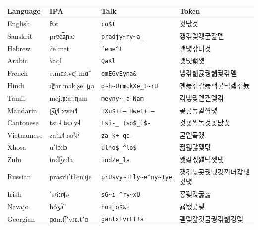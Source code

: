 \begin{center}
\small
\begin{tabular}{l >{\ipafont}l l >{\tokenfont}l}
\toprule
Language & IPA & Talk & Token \\
\midrule
English & θɔt & \texttt{co\$t} & 궟닧것 \\
Sanskrit & prɐd͡ʑɲaː & \texttt{pradjy\textasciitilde{}ny\textasciitilde{}a\_} & 걯긲뎇겏궅갎뎉 \\
Hebrew & ʔeˈmet & \texttt{'eme\textasciicircum{}t} & 괲넇갂너것 \\
Arabic & ʕaql & \texttt{QaKl} & 괯뎇괣껯 \\
French & e.mɛʁ.vɛj.mɑ̃ & \texttt{emEGvEyma\&} & 넇갂뉇귡궝뉇귗갂뎯 \\
Hindi & d̪ʱər.mək.ʂeː.t̪ɾə & \texttt{d\textasciitilde{}h\textasciitilde{}UrmUkXe\_t\textasciitilde{}rU} & 곈뇷긲갂뇷괙궇넉겗긲뇷 \\
Tamil & mej.ɲːaː.ɳam & \texttt{meyny\textasciitilde{}\_a\_Nam} & 갂넇귗뎉걜뎇갂 \\
Mandarin & ʈ͡ʂɻ̩˥˩ xweɪ˥˩ & \texttt{TXu\$++-- HweI++--} & 곻궇돜귙꼌넇 \\
Cantonese & tsiː˨ tsɔːy˨ & \texttt{tsi-\_ tso\$\_i\$-} & 것굣꾁돜것굣닩꿏 \\
Vietnamese & zaːk˧˦ ŋoˀ˨˩ˀ & \texttt{za\_k+ qo---} & 굳뎉돜걨 \\
Xhosa & uˈǁɔːlɔ & \texttt{ul*o\$\_\textasciicircum{}lo\$} & 뀗됂닪껯닧 \\
Zulu & ind͡ɮeːla & \texttt{indZe\_la} & 꽷갊겏꺭넉껯뎇 \\
Russian & prəsvʲɪˈtlʲenʲɪje & \texttt{prUsvy\textasciitilde{}Itly\textasciitilde{}e\textasciicircum{}ny\textasciitilde{}Iye} & 걯긲뇷굣궞낷것꺽너갎낷귗넇 \\
Irish & ˈsˠiːɾʲʃə & \texttt{sG\textasciitilde{}i\_\textasciicircum{}ry\textasciitilde{}xU} & 굫꽺긵굻뇷 \\
Navajo & hóʒɔ̃́ & \texttt{ho+jo\$\&+} & 귧놳궃댛 \\
Georgian & ɡɑn.t͡ʃʼvɾɛ.tʼɑ & \texttt{gantx!vrEt!a} & 괟뎇갊것굼궝긲뉇겅뎇 \\
\bottomrule
\end{tabular}
\end{center}
